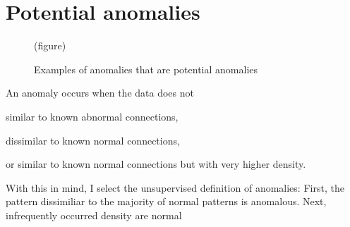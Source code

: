 \section{Potential anomalies}

\begin{figure}[htb2]
\begin{center}
(figure)
\end{center}
\caption{Examples of anomalies that are potential anomalies}
\label{fig:refSingleRobot1}
\end{figure}

An anomaly occurs when the data does not \begin{inparaenum}
\item similar to known abnormal connections,
\item dissimilar to known normal connections,
\item or similar to known normal connections but with very higher density.
\end{inparaenum}

With this in mind, I select the unsupervised definition of anomalies:
First, the pattern dissimiliar to the majority of normal patterns is anomalous.
Next, infrequently occurred density are normal


